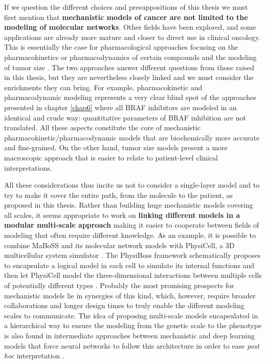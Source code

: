 \documentclass[a4paper,12pt,twoside,onecolumn,openright,final,oldfontcommands]{memoir}
\begin{document}
If we question the different choices and presuppositions of this thesis
we must first mention that \textbf{mechanistic models of cancer are not
limited to the modeling of molecular networks}. Other fields have been
explored, and some applications are already more mature and closer to
direct use in clinical oncology. This is essentially the case for
pharmacological approaches focusing on the pharmacokinetics or
pharmacodynamics of certain compounds and the modeling of tumor size
\citep{benzekry2020artificial}. The two approaches answer different
questions from those raised in this thesis, but they are nevertheless
closely linked and we must consider the enrichments they can bring. For
example, pharmacokinetic and pharmacodynamic modeling represents a very
clear blind spot of the approaches presented in chapter \ref{chap6}
where all BRAF inhibitors are modeled in an identical and crude way:
quantitative parameters of BRAF inhibition are not translated. All these
aspects constitute the core of mechanistic
pharmacokinetic/pharmacodynamic models that are biochemically more
accurate and fine-grained. On the other hand, tumor size models present
a more macroscopic approach that is easier to relate to patient-level
clinical interpretations.

All these considerations thus incite us not to consider a single-layer
model and to try to make it cover the entire path, from the molecule to
the patient, as proposed in this thesis. Rather than building huge
mechanistic models covering all scales, it seems appropriate to work on
\textbf{linking different models in a modular multi-scale approach}
making it easier to cooperate between fields of modeling that often
require different knowledge. As an example, it is possible to combine
MaBoSS and its molecular network models with PhysiCell, a 3D
multicellular system simulator \citep{ghaffarizadeh2018physicell}. The
PhysiBoss framework schematically proposes to encapsulate a logical
model in each cell to simulate its internal functions and then let
PhysiCell model the three-dimensional interactions between multiple
cells of potentially different types \citep{letort2019physiboss}.
Probably the most promising prospects for mechanistic models lie in
synergies of this kind, which, however, require broader collaborations
and longer design times to truly enable the different modeling scales to
communicate. The idea of proposing multi-scale models encapsulated in a
hierarchical way to ensure the modeling from the genetic scale to the
phenotype is also found in intermediate approaches between mechanistic
and deep learning models that force neural networks to follow this
architecture in order to ease \emph{post hoc} interpretation
\citep{ma2018using}.
\end{document}
